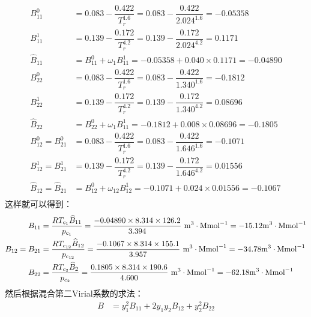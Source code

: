 \documentclass[UTF8,a4paper,oneside]{book}
\newcounter{tipname}
\newenvironment{tip}{\begin{tpp}{\stepcounter{tipname}\Large\textbf{{\calligra{Tip \arabic{tipname}}}}}}{\end{tpp}\par}
\begin{document}
\begin{tip}
\begin{equation*}
		\begin{aligned}
			B^{0}_{11} &= 0.083-\dfrac{0.422}{T_{r}^{1.6}} = 0.083-\dfrac{0.422}{2.024^{1.6}} =-0.05358\\
		B^{1}_{11} &= 0.139-\dfrac{0.172}{T_{r}^{4.2}} = 0.139-\dfrac{0.172}{2.024^{4.2}} =0.1171\\
		\widehat{B}_{11} &= B^{0}_{11}+\omega_{1} B^{1}_{11} = -0.05358+0.040\times 0.1171 = -0.04890\\
		B^{0}_{22} &= 0.083-\dfrac{0.422}{T_{r}^{1.6}} = 0.083-\dfrac{0.422}{1.340^{1.6}} =-0.1812\\
		B^{1}_{22} &= 0.139-\dfrac{0.172}{T_{r}^{4.2}} = 0.139-\dfrac{0.172}{1.340^{4.2}} =0.08696\\
		\widehat{B}_{22} &= B^{0}_{22}+\omega_{1} B^{1}_{11} = -0.1812+0.008\times 0.08696 = -0.1805\\
		B^{0}_{12} =B^{0}_{21} &= 0.083-\dfrac{0.422}{T_{r}^{1.6}} = 0.083-\dfrac{0.422}{1.646^{1.6}} =-0.1071\\
		B^{1}_{12}=B^{1}_{21} &= 0.139-\dfrac{0.172}{T_{r}^{4.2}} = 0.139-\dfrac{0.172}{1.646^{4.2}} =0.01556\\
		\widehat{B}_{12}=\widehat{B}_{21} &= B^{0}_{12}+\omega_{12} B^{1}_{12} = -0.1071+0.024\times 0.01556 = -0.1067\\
		\end{aligned}
	\end{equation*}
	这样就可以得到：
	\begin{equation*}
		\begin{aligned}
			B_{11} &= \dfrac{RT_{c_{1}}\widehat{B}_{11}}{p_{c_{1}}}=\dfrac{-0.04890\times 8.314\times 126.2}{3.394}  \ {\rm{m}}^{3}\cdot{\rm{Mmol}}^{-1}=-15.12 {\rm{m}}^{3}\cdot{\rm{Mmol}}^{-1}\\
			B_{12}=B_{21} &= \dfrac{RT_{c_{12}}\widehat{B}_{12}}{p_{c_{12}}}=\dfrac{-0.1067\times 8.314\times 155.1}{3.957} \  {\rm{m}}^{3}\cdot{\rm{Mmol}}^{-1}=-34.78 {\rm{m}}^{3}\cdot{\rm{Mmol}}^{-1}\\
			B_{22} &= \dfrac{RT_{c_{2}}\widehat{B}_{2}}{p_{c_{2}}}=\dfrac{0.1805\times 8.314\times 190.6}{4.600}\   {\rm{m}}^{3}\cdot{\rm{Mmol}}^{-1}=-62.18 {\rm{m}}^{3}\cdot{\rm{Mmol}}^{-1}\\
		\end{aligned}
	\end{equation*}
然后根据混合第二Virial系数的求法：
\begin{equation*}
	\begin{aligned}
		B &= y_{1}^{2}B_{11}+2y_{1}y_{2}B_{12}+y_{2}^{2}B_{22} \\

\end{aligned}
\end{equation*}
\end{tip}
\end{document}
